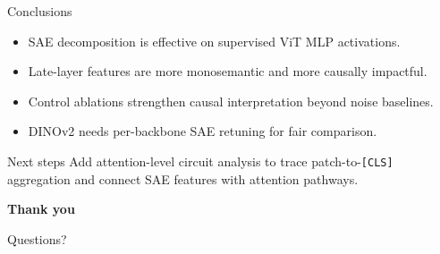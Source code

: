 \documentclass[aspectratio=169,t,xcolor=table]{beamer}
\begin{document}
\begin{frame}{Conclusions}
\begin{itemize}
    \item SAE decomposition is effective on supervised ViT MLP activations.
    \item Late-layer features are more monosemantic and more causally impactful.
    \item Control ablations strengthen causal interpretation beyond noise baselines.
    \item DINOv2 needs per-backbone SAE retuning for fair comparison.
\end{itemize}

\vspace{0.4em}
\begin{recommendationblock}{Next steps}
Add attention-level circuit analysis to trace patch-to-\texttt{[CLS]} aggregation and connect SAE features with attention pathways.
\end{recommendationblock}
\end{frame}

\begin{frame}
\centering
\vspace{1.4cm}
{\Huge \bfseries Thank you}

\vspace{0.8cm}
{\Large Questions?}
\end{frame}
\end{document}
